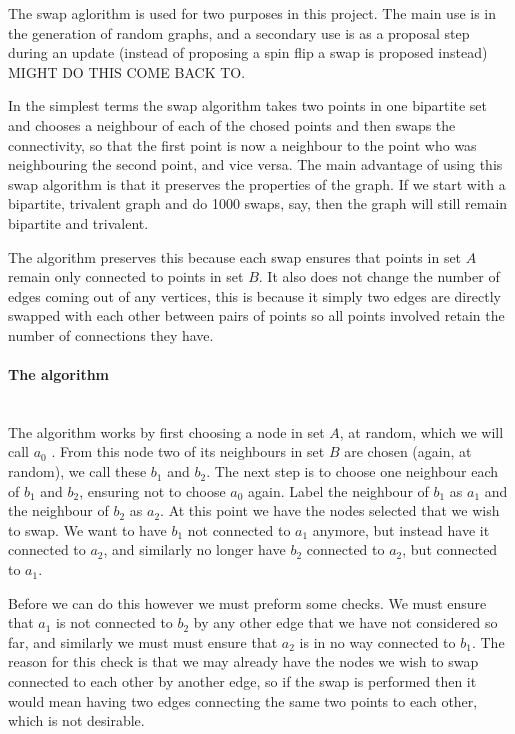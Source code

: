 \documentclass[pdftex,12pt,a4paper]{article}
\begin{document}
The swap aglorithm is used for two purposes in this project. The main use is in the generation of random graphs, and a secondary use is as a proposal step during an update (instead of proposing a spin flip a swap is proposed instead) MIGHT DO THIS COME BACK TO.

In the simplest terms the swap algorithm takes two points in one bipartite set and chooses a neighbour of each of the chosed points and then swaps the connectivity, so that the first point is now a neighbour to the point who was neighbouring the second point, and vice versa. The main advantage of using this swap algorithm is that it preserves the properties of the graph. If we start with a bipartite, trivalent graph and do 1000 swaps, say, then the graph will still remain bipartite and trivalent.

The algorithm preserves this because each swap ensures that points in set $A$ remain only connected to points in set $B$. It also does not change the number of edges coming out of any vertices, this is because it simply two edges are directly swapped with each other between pairs of points so all points involved retain the number of connections they have.

\paragraph{The algorithm} ~\\

The algorithm works by first choosing a node in set $A$, at random, which we will call $a_0$ . From this node two of its neighbours in set $B$ are chosen (again, at random), we call these $b_1$ and $b_2$. The next step is to choose one neighbour each of $b_1$ and $b_2$, ensuring not to choose $a_0$ again. Label the neighbour of $b_1$ as $a_1$ and the neighbour of $b_2$ as $a_2$. At this point we have the nodes selected that we wish to swap. We want to have $b_1$ not connected to $a_1$ anymore, but instead have it connected to $a_2$, and similarly no longer have $b_2$ connected to $a_2$, but connected to $a_1$.

Before we can do this however we must preform some checks. We must ensure that $a_1$ is not connected to $b_2$ by any other edge that we have not considered so far, and similarly we must must ensure that $a_2$ is in no way connected to $b_1$. The reason for this check is that we may already have the nodes we wish to swap connected to each other by another edge, so if the swap is performed then it would mean having two edges connecting the same two points to each other, which is not desirable.
\end{document}
